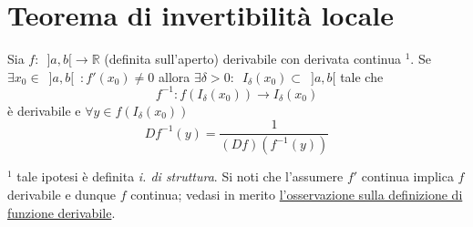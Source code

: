 \documentclass[10pt, oneside]{book}
\theoremstyle{plain}
\begin{document}
\section{Teorema di invertibilità locale}
\begin{ther}
Sia $f : \enspace ]a, b[ \rightarrow \mathbb{R}$ (definita sull'aperto) derivabile con derivata continua $^1$. Se $\exists x_0 \in \enspace ]a, b[ \enspace : f'(x_0) \neq 0$ allora $\exists \delta > 0 : \enspace I_\delta(x_0) \subset \enspace ]a, b[$ tale che
\[f^{-1} : f(I_\delta(x_0)) \rightarrow I_\delta(x_0)\] è derivabile e $\forall y \in f(I_\delta(x_0))$ \[D f^{-1}(y) = \frac{1}{(Df) (f^{-1}(y))}\]
\end{ther}
\textbf{$^1$} tale ipotesi è definita \textit{i. di struttura}. Si noti che l'assumere $f'$ continua implica $f$ derivabile e dunque $f$ continua; vedasi in merito \hyperref[subsubsec:derivabili]{l'osservazione sulla definizione di funzione derivabile}.
\end{document}
